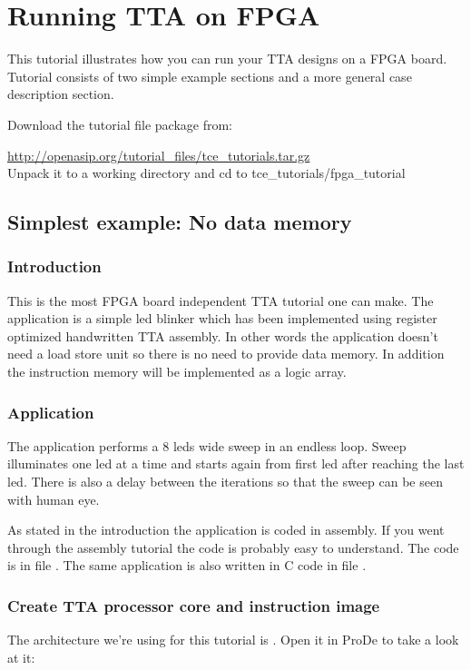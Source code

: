\documentclass[twoside]{tceusermanual}
\begin{document}
\section{Running TTA on FPGA}
\label{sec:fpgatutorial}

This tutorial illustrates how you can run your TTA designs on a FPGA board.
Tutorial consists of two simple example sections and a more general case
description section.

Download the tutorial file package from:

\url{http://openasip.org/tutorial_files/tce_tutorials.tar.gz}\\

Unpack it to a working directory and cd to tce\_tutorials/fpga\_tutorial

\subsection{Simplest example: No data memory}
\subsubsection{Introduction}
This is the most FPGA board independent TTA tutorial one can make. The
application is a simple led blinker which has been implemented using register
optimized handwritten TTA assembly. In other words the application
doesn't need a load store unit so there is no need to provide data memory. In
addition the instruction memory will be implemented as a logic array.

\subsubsection{Application}
The application performs a 8 leds wide sweep in an endless loop. Sweep 
illuminates one led at a time and starts again from first led after reaching
the last led. There is also a delay between the iterations so that the sweep
can be seen with human eye.

As stated in the introduction the application is coded in assembly. If you went
through the assembly tutorial the code is probably easy to understand. The code
is in file . The same application is also written in C code
in file .

\subsubsection{Create TTA processor core and instruction image}
The architecture we're using for this tutorial is . Open it
in ProDe to take a look at it:
\end{document}
